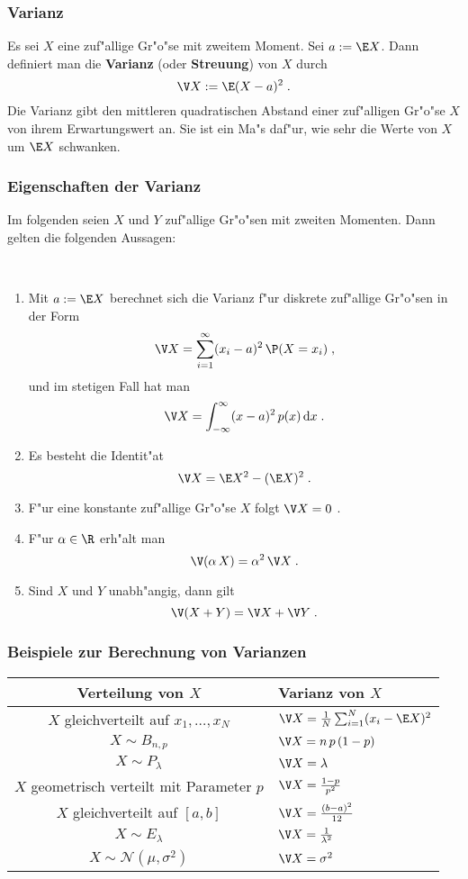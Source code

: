 \subsubsection{Varianz}
Es sei $X$ eine zuf"allige Gr"o"se mit zweitem Moment. Sei $a:=\E X$. Dann definiert man
die \textbf{Varianz} (oder \textbf{Streuung}) von $X$ durch
$$
\V X:= \E(X-a)^2\;.
$$
Die Varianz gibt den mittleren quadratischen Abstand einer zuf"alligen Gr"o"se $X$ von ihrem
Erwartungswert an. Sie ist ein Ma"s daf"ur, wie sehr die Werte von $X$ um $\E X$ schwanken.

\subsubsection{Eigenschaften der Varianz}
Im folgenden seien $X$ und $Y$ zuf"allige Gr"o"sen mit zweiten Momenten. Dann gelten die
folgenden Aussagen$\colon$
\begin{thm}~
\begin{enumerate}
\item
Mit $a:=\E X$ berechnet sich die Varianz f"ur diskrete zuf"allige Gr"o"sen in der Form
$$
\V X = \sum_{i=1}^\infty (x_i-a)^2\,\P(X=x_i)\;,
$$
und im stetigen Fall hat man
$$
\V X =\int_{-\infty}^\infty (x-a)^2\,p(x)\,\mathrm d x\;.
$$
\item
Es besteht die Identit"at
$$
\V X = \E X^2 -(\E X)^2\;.
$$
\item
F"ur eine konstante zuf"allige Gr"o"se $X$ folgt $\V X=0$ .
\item
F"ur $\alpha\in\R$ erh"alt man
$$
\V(\alpha\,X)=\alpha^2\,\V X\;.
$$
\item
Sind $X$ und $Y$ unabh"angig, dann gilt
$$
\V(X+Y)=\V X + \V Y\;.
$$
\end{enumerate}

\end{thm}
\subsubsection{Beispiele zur Berechnung von Varianzen}

\medskip

{\renewcommand{\arraystretch}{1.4}
\begin{center}
\begin{tabular}{|c|l|}\hline
\bf Verteilung von $X$& \bf Varianz von $X$\\ \hline\hline
$X$ gleichverteilt auf $x_1,\ldots,x_N$& $\V X=\frac{1}{N}\sum_{i=1}^N (x_i-\E X)^2$\\ \hline
$X\sim B_{n,p}$& $\V X= n\,p\,(1-p)$\\ \hline
$X\sim P_\lambda$&$\V X= \lambda$\\ \hline
$X$ geometrisch verteilt mit Parameter $p$& $\V X = \frac{1-p}{p^2}$\\ \hline
$X$ gleichverteilt auf $[a,b]$& $\V X= \frac{(b-a)^2}{12}$\\ \hline
$X\sim E_\lambda$& $\V X = \frac{1}{\lambda^2}$\\ \hline
$X\sim \mathcal N(\mu,\sigma^2)$&$ \V X = \sigma^2$\\ \hline
\end{tabular}
\end{center}
}
